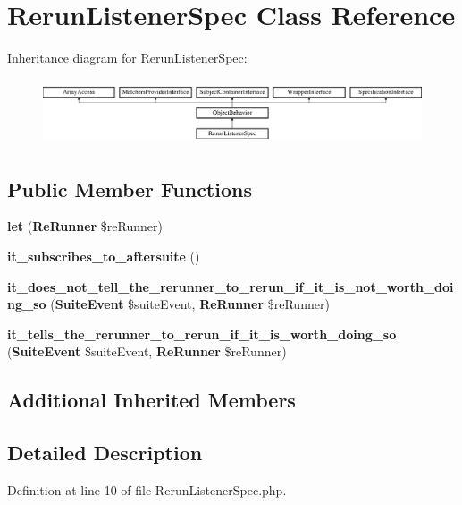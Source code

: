 \section{Rerun\+Listener\+Spec Class Reference}
\label{classspec_1_1_php_spec_1_1_listener_1_1_rerun_listener_spec}
Inheritance diagram for Rerun\+Listener\+Spec\+:\begin{figure}[H]
\begin{center}
\leavevmode
\includegraphics[height=1.953488cm]{classspec_1_1_php_spec_1_1_listener_1_1_rerun_listener_spec}
\end{center}
\end{figure}
\subsection*{Public Member Functions}
\begin{DoxyCompactItemize}
\item 
{\bf let} ({\bf Re\+Runner} \$re\+Runner)
\item 
{\bf it\+\_\+subscribes\+\_\+to\+\_\+aftersuite} ()
\item 
{\bf it\+\_\+does\+\_\+not\+\_\+tell\+\_\+the\+\_\+rerunner\+\_\+to\+\_\+rerun\+\_\+if\+\_\+it\+\_\+is\+\_\+not\+\_\+worth\+\_\+doing\+\_\+so} ({\bf Suite\+Event} \$suite\+Event, {\bf Re\+Runner} \$re\+Runner)
\item 
{\bf it\+\_\+tells\+\_\+the\+\_\+rerunner\+\_\+to\+\_\+rerun\+\_\+if\+\_\+it\+\_\+is\+\_\+worth\+\_\+doing\+\_\+so} ({\bf Suite\+Event} \$suite\+Event, {\bf Re\+Runner} \$re\+Runner)
\end{DoxyCompactItemize}
\subsection*{Additional Inherited Members}


\subsection{Detailed Description}


Definition at line 10 of file Rerun\+Listener\+Spec.\+php.



